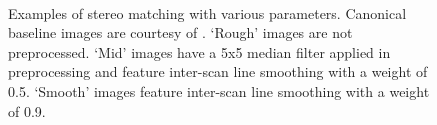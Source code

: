 \begin{figure}[p]
 \\

 \caption[Examples of stereo matching with various parameters]{Examples of
   stereo matching with various parameters. Canonical baseline images are
   courtesy of \citet{stereocorrespondence}. `Rough' images are not
   preprocessed. `Mid' images have a 5x5 median filter applied in preprocessing
   and feature inter-scan line smoothing with a weight of 0.5. `Smooth' images
   feature inter-scan line smoothing with a weight of 0.9.}
 \label{fig:stereo-image-depth-maps}
\end{figure}

